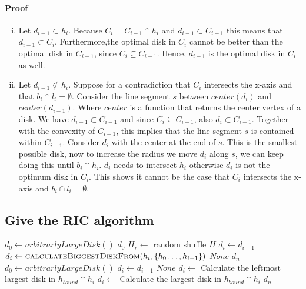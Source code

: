\documentclass{article}
\begin{document}
\paragraph{Proof}
\begin{enumerate}[(i)]
	\item Let $d_{i-1} \subset h_i$. Because $C_i = C_{i-1}\cap h_i$ and
		$d_{i-1} \subset C_{i-1}$ this means that $d_{i-1} \subset C_i$.
		Furthermore,the optimal disk in $C_i$
		cannot be better than the optimal disk in $C_{i-1}$, since
		$C_i \subseteq C_{i-1}$. Hence, $d_{i-1}$ is the optimal disk
		in $C_i$ as well.
	\item Let $d_{i-1} \not\subset h_{i}$. Suppose for a contradiction that
		$C_i$ intersects the x-axis and that $b_i \cap l_i = \emptyset$.
		Consider the line segment $s$ between $center(d_i)$ and 
		$center(d_{i-1})$.
		Where $center$ is a function that returns the center vertex of a disk.
		We have $d_{i-1} \subset C_{i-1}$ and
		since $C_i \subseteq C_{i-1}$, also $d_i \subset C_{i-1}$.
		Together with the convexity of $C_{i-1}$, this implies that
		the line segment $s$ is contained within $C_{i-1}$.
		Consider $d_i$ with the center at the end of $s$.
		This is the smallest possible disk,
		now to increase the radius we move $d_i$ along $s$,
		we can keep doing this until $b_i \cap h_i$.
		$d_i$ needs to intersect $h_i$ otherwise $d_i$ is not the optimum
		disk in $C_i$. This shows it cannot be the case that $C_i$ intersects
		the x-axis and $b_i\cap l_i = \emptyset$.

\end{enumerate}
\subsection{Give the RIC algorithm}

\begin{algorithmic}[1]
		\State
		$d_0 \gets arbitrarlyLargeDisk()$
			\State
			\Return $d_0$
		\EndIf
		\State
		$H_r \gets$ random shuffle $H$
			\State
			$d_i \gets d_{i-1}$
			\State
			$d_i \gets \Call{calculateBiggestDiskFrom}{h_i, \{h_0\dots,h_{i-1}\}}$
				\State
				\Return $None$
			\EndIf
			\EndIf
		\EndFor
		\State
		\Return $d_n$
	\EndFunction
		\State
		$d_0 \gets arbitrarlyLargeDisk()$
			\State
			$d_i \gets d_{i-1}$
					\State
					\Return $None$
				\EndIf
				\State
				$d_i \gets$ Calculate the leftmost largest disk in $h_{bound} \cap h_{i}$
				\Else
				\State
				$d_i \gets$ Calculate the largest disk in $h_{bound} \cap h_{i}$
				\EndIf
				\State
			\EndIf
			\EndIf
		\EndFor
		\State
		\Return $d_n$
	\EndFunction
\end{algorithmic}
\end{document}
